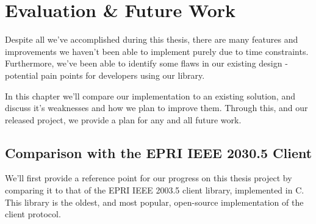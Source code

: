 \chapter{Evaluation \& Future Work}\label{ch:future}
Despite all we've accomplished during this thesis, there are many features and improvements we haven't been able to implement purely due to time constraints.
Furthermore, we've been able to identify some flaws in our existing design - potential pain points for developers using our library.

In this chapter we'll compare our implementation to an existing solution, and discuss it's weaknesses and how we plan to improve them. Through this, and our released project, we provide a plan for any and all future work.

\section{Comparison with the EPRI IEEE 2030.5 Client}
We'll first provide a reference point for our progress on this thesis project by comparing it to that of the EPRI IEEE 2003.5 client library, implemented in C.
This library is the oldest, and most popular, open-source implementation of the client protocol.

